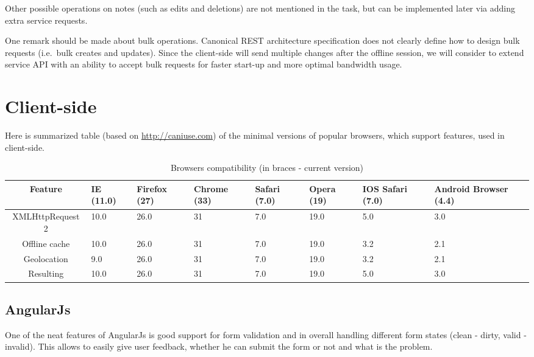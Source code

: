 \documentclass[12pt,a4paper]{article}
\begin{document}
Other possible operations on notes (such as edits and deletions) are not mentioned in the task, but can be implemented later via adding extra service requests.

One remark should be made about bulk operations.
Canonical REST architecture specification does not clearly define how to design bulk requests (i.e.\ bulk creates and updates).
Since the client-side will send multiple changes after the offline session, we will consider to extend service API with an ability to accept bulk requests
for faster start-up and more optimal bandwidth usage.

\section{Client-side}

Here is summarized table (based on \url{http://caniuse.com}) of the minimal
versions of popular browsers, which support features, used in client-side.

\begin{table}[h!]
    \caption{Browsers compatibility (in braces - current version)}
    \begin{tabularx}{\linewidth}{|c|X|X|X|X|X|X|X|}
        \hline
        Feature & IE (11.0) & Firefox (27) & Chrome (33) & Safari (7.0) & Opera (19) & IOS Safari (7.0) & Android Browser (4.4) \\ \hline
        XMLHttpRequest 2 & 10.0 & 26.0 & 31 & 7.0 & 19.0 & 5.0 & 3.0 \\ \hline
        Offline cache    & 10.0 & 26.0 & 31 & 7.0 & 19.0 & 3.2 & 2.1 \\ \hline
        Geolocation      &  9.0 & 26.0 & 31 & 7.0 & 19.0 & 3.2 & 2.1 \\ \hline
        \hline
        Resulting        & 10.0 & 26.0 & 31 & 7.0 & 19.0 & 5.0 & 3.0 \\ \hline
    \end{tabularx}
\end{table}

\subsection{AngularJs}

One of the neat features of AngularJs is good support for form validation and in overall
handling different form states (clean - dirty, valid - invalid). This allows to 
easily give user feedback, whether he can submit the form or not and what is the problem.
\end{document}
